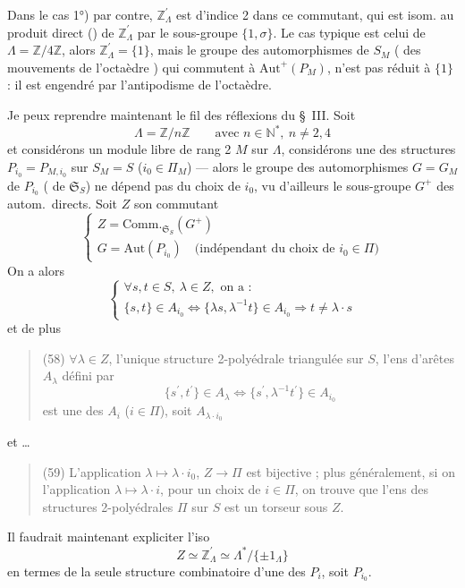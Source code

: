 \documentclass[11pt,a4paper]{article}
\begin{document}
Dans le cas 1°) par contre, $\mathbb{Z}^{\prime}_\Lambda$ est d'indice 2 dans ce commutant, qui
est isom. au produit direct () de $\mathbb{Z}^{\prime}_\Lambda$ par
le sous-groupe $\{1,\sigma\}$. Le cas typique est celui de 
$\Lambda=\mathbb{Z}/4\mathbb{Z}$, alors $\mathbb{Z}^{\prime}_\Lambda = \{1\}$, mais le
groupe des automorphismes de $S_M$ ( des mouvements de
l'octaèdre ) qui commutent à $\mathrm{Aut}^{+}(P_M)$, n'est pas réduit à $\{1\}$ : il est
engendré par l'antipodisme de l'octaèdre.

Je peux reprendre maintenant le fil des réflexions du §~III. Soit
\[
\Lambda = \mathbb{Z}/n\mathbb{Z} \qquad\text{avec } n\in\mathbb{N}^{*},\ n\neq 2,4
\]
et considérons un module libre de rang 2 $M$ sur $\Lambda$, considérons une des structures
$P_{i_0} = P_{M,i_0}$ sur $S_M = S$ ($i_0\in\Pi_M$) — alors le groupe des automorphismes
$G = G_M$ de $P_{i_0}$ ( de $\mathfrak{S}_S$) ne dépend pas du choix de
$i_0$, vu \ill{} d'ailleurs le sous-groupe $G^{+}$ des autom.\ directs.
Soit $Z$ son commutant \struck{\ill{}}
\[
\tag{56}
\begin{cases}
Z = \mathrm{Comm.}_{\mathfrak{S}_S}(G^{+})\\
G = \mathrm{Aut}(P_{i_0}) \quad \text{(indépendant du choix de } i_0\in\Pi)
\end{cases}
\]
On a alors
\[
\tag{57}
\begin{cases}
\forall s,t\in S,\ \lambda\in Z, \text{ on a :}\\
\{s,t\}\in A_{i_0} \iff \{\lambda s, \lambda^{-1}t\}\in A_{i_0} \Longrightarrow t\neq \lambda\cdot s
\end{cases}
\]
et de plus
\begin{quote}
(58) $\forall\lambda\in Z$, l'unique structure 2-polyédrale triangulée sur $S$, \struck{\ill{}}
l'ens d'arêtes $A_\lambda$ défini par
\[
\{s^{\prime},t^{\prime}\}\in A_\lambda \iff \{s^{\prime},\lambda^{-1}t^{\prime}\}\in A_{i_0}
\]
est \struck{\ill{}} une des $A_i$ ($i\in\Pi$), soit $A_{\lambda\cdot i_0}$
\end{quote}
et  …

\begin{quote}
(59) L'application $\lambda\mapsto\lambda\cdot i_0$, $Z\to\Pi$ est bijective ; plus généralement,
si on  \ill{} l'application $\lambda\mapsto\lambda\cdot i$, pour un choix
de $i\in\Pi$, on trouve que l'ens des structures 2-polyédrales $\Pi$ sur $S$ est
un torseur sous $Z$.
\end{quote}
Il faudrait maintenant expliciter l'iso
\[
\tag{60}
Z \simeq \mathbb{Z}^{\prime}_\Lambda \simeq \Lambda^{*}/\{\pm1_\Lambda\}
\]
en termes de la seule structure combinatoire d'une des $P_i$, soit $P_{i_0}$.
\end{document}
